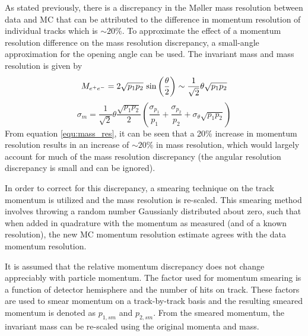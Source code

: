 As stated previously, there is a discrepancy in the M\o ller mass resolution between data and MC that can be attributed to the difference in momentum resolution of individual tracks which is $\sim20$\%. To approximate the effect of a momentum resolution difference on the mass resolution discrepancy, a small-angle approximation for the opening angle can be used. The invariant mass and mass resolution is given by
\begin{equation}
    M_{e^{+}e^{-}} = 2 \sqrt{p_1 p_2} \ \mathrm{sin} \left( \frac{\theta}{2} \right) \sim \frac{1}{\sqrt{2}}\theta \sqrt{p_{1}p_{2}}
\end{equation}
\begin{equation}
    \sigma_m = \frac{1}{\sqrt{2}} \theta \frac{\sqrt{p_{1}p_{2}}}{2}
        \left( \frac{\sigma_{p_1}}{p_1} + \frac{\sigma_{p_2}}{p_2} 
        + \sigma_{\theta} \sqrt{p_{1}p_{2}} \right)
    \label{equ:mass_res}
\end{equation}
From equation \ref{equ:mass_res}, it can be seen that a 20\% increase in momentum resolution results in an increase of $\sim 20\%$ in mass resolution,  which would largely account for much of the mass resolution discrepancy (the angular resolution discrepancy is small and can be ignored). 

In order to correct for this discrepancy, a smearing technique on the track momentum is utilized and the mass resolution is re-scaled. This smearing method involves throwing a random number Gaussianly distributed about zero, such that when added in quadrature with the momentum as measured (and of a known resolution), the new MC momentum resolution estimate agrees with the data momentum resolution. %


It is assumed that the relative momentum discrepancy does not change appreciably with particle momentum. The factor used for momentum smearing is a function of detector hemisphere and the number of hits on track. These factors are used to smear momentum on a track-by-track basis and the resulting smeared momentum is denoted as $p_{1,sm}$ and $p_{2,sm}$. From the smeared momentum, the invariant mass can be re-scaled using the original momenta and mass.

